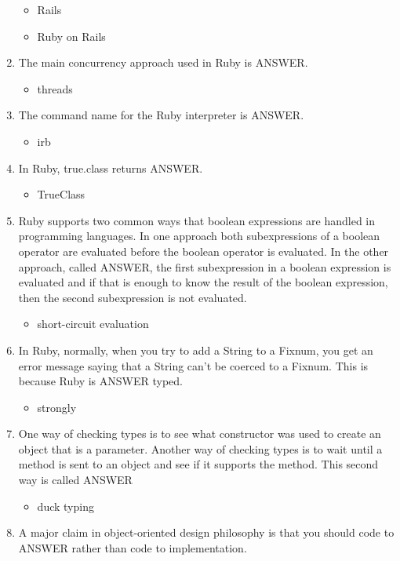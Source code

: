\documentclass{exam}
\begin{document}
\begin{enumerate}
\begin{itemize}
\item Rails
\item Ruby on Rails
\end{itemize}
\item The main concurrency approach used in Ruby is ANSWER.
\begin{itemize}
\item threads
\end{itemize}
\item The command name for the Ruby interpreter is ANSWER.
\begin{itemize}
\item irb
\end{itemize}
\item In Ruby, true.class returns ANSWER.
\begin{itemize}
\item TrueClass
\end{itemize}
\item Ruby supports two common ways that boolean expressions are handled in programming languages.  In one approach both subexpressions of a boolean operator are evaluated before the boolean operator is evaluated.  In the other approach, called ANSWER, the first subexpression in a boolean expression is evaluated and if that is enough to know the result of the boolean expression, then the second subexpression is not evaluated.
\begin{itemize}
\item short-circuit evaluation
\end{itemize}
\item In Ruby, normally, when you try to add a String to a Fixnum, you get an error message saying that a String can't be coerced to a Fixnum.  This is because Ruby is ANSWER typed.
\begin{itemize}
\item strongly
\end{itemize}
\item One way of checking types is to see what constructor was used to create an object that is a parameter.  Another way of checking types is to wait until a method is sent to an object and see if it supports the method.  This second way is called ANSWER
\begin{itemize}
\item duck typing
\end{itemize}
\item A major claim in object-oriented design philosophy is that you should code to ANSWER rather than code to implementation.

\end{enumerate}
\end{document}
